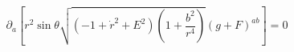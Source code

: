 \begin{equation}
\partial_a \left[ r^2 \sin\theta \sqrt{(-1+\dot{r}^2+E^2)
\left(1+\frac{b^2}{r^4}\right)} (g+F)^{ab} \right]
=0
\end{equation}

